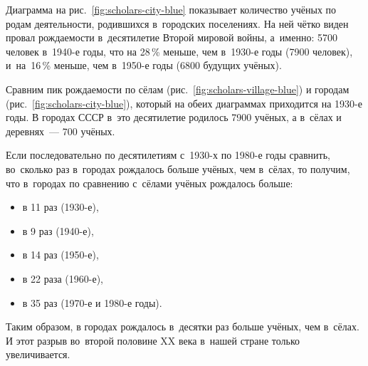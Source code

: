 Диаграмма на рис.~\ref{fig:scholars-city-blue} показывает количество учёных по родам деятельности, родившихся в~городских поселениях.
На ней чётко виден провал рождаемости в~десятилетие Второй мировой войны, 
а~именно: 5700 человек в~1940-е годы, что на 28\,\% меньше, чем в~1930-е годы (7900 человек), 
и~на~16\,\% меньше, чем в~1950-е годы (6800 будущих учёных). 

Сравним пик рождаемости по сёлам (рис.~\ref{fig:scholars-village-blue}) 
                       и городам (рис.~\ref{fig:scholars-city-blue}), 
который на обеих диаграммах приходится на 1930-е годы. 
В городах СССР в~это десятилетие родилось 7900 учёных, а в~сёлах и деревнях~--- 700 учёных. 

Если последовательно по десятилетиям с~1930-х по 1980-е годы 
сравнить, во~сколько раз в~городах рождалось больше учёных, чем в~сёлах, 
то получим, что в~городах по сравнению с~сёлами учёных рождалось больше:
\begin{itemize}[noitemsep,topsep=0pt,leftmargin=24pt]
  \item в 11 раз (1930-е), 
  \item в 9 раз (1940-е), 
  \item в 14 раз (1950-е), 
  \item в 22 раза (1960-е), 
  \item в 35 раз (1970-е и 1980-е годы).
\end{itemize}

Таким образом, в городах рождалось в~десятки раз больше учёных, чем в~сёлах. 
И этот разрыв во~второй половине XX века в~нашей стране только увеличивается. 
